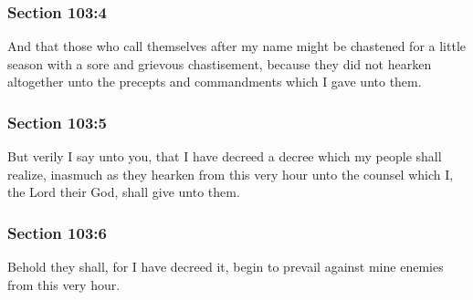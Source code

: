 	\subsubsection{Section 103:4} %
		\label{DC103-4}

		And that those who call themselves after my name might be chastened for a little season with a sore and grievous chastisement, because they did not hearken altogether unto the precepts and commandments which I gave unto them.


	\subsubsection{Section 103:5} %
		\label{DC103-5}

		But verily I say unto you, that I have decreed a decree which my people shall realize, inasmuch as they hearken from this very hour unto the counsel which I, the Lord their God, shall give unto them.


	\subsubsection{Section 103:6} %
		\label{DC103-6}

		Behold they shall, for I have decreed it, begin to prevail against mine enemies from this very hour.


